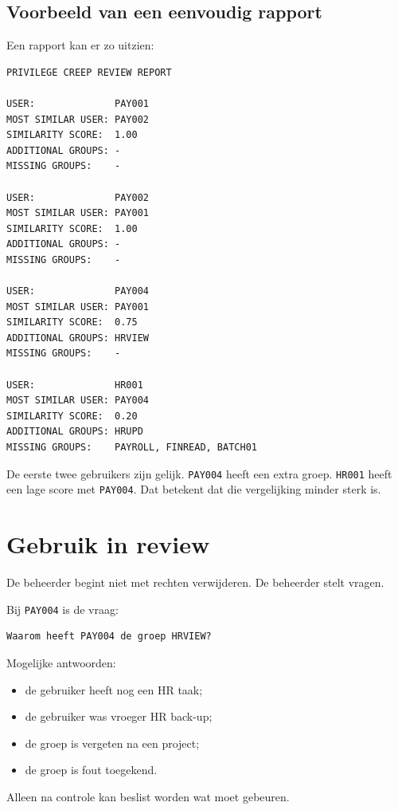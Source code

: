 \subsection*{Voorbeeld van een eenvoudig rapport}

Een rapport kan er zo uitzien:

\begin{verbatim}
PRIVILEGE CREEP REVIEW REPORT

USER:              PAY001
MOST SIMILAR USER: PAY002
SIMILARITY SCORE:  1.00
ADDITIONAL GROUPS: -
MISSING GROUPS:    -

USER:              PAY002
MOST SIMILAR USER: PAY001
SIMILARITY SCORE:  1.00
ADDITIONAL GROUPS: -
MISSING GROUPS:    -

USER:              PAY004
MOST SIMILAR USER: PAY001
SIMILARITY SCORE:  0.75
ADDITIONAL GROUPS: HRVIEW
MISSING GROUPS:    -

USER:              HR001
MOST SIMILAR USER: PAY004
SIMILARITY SCORE:  0.20
ADDITIONAL GROUPS: HRUPD
MISSING GROUPS:    PAYROLL, FINREAD, BATCH01
\end{verbatim}

De eerste twee gebruikers zijn gelijk. \texttt{PAY004} heeft een extra groep. \texttt{HR001} heeft een lage score met \texttt{PAY004}. Dat betekent dat die vergelijking minder sterk is.

\section{Gebruik in review}

De beheerder begint niet met rechten verwijderen. De beheerder stelt vragen.

Bij \texttt{PAY004} is de vraag:

\begin{verbatim}
Waarom heeft PAY004 de groep HRVIEW?
\end{verbatim}

Mogelijke antwoorden:

\begin{itemize}
	\item de gebruiker heeft nog een HR taak;
	\item de gebruiker was vroeger HR back-up;
	\item de groep is vergeten na een project;
	\item de groep is fout toegekend.
\end{itemize}

Alleen na controle kan beslist worden wat moet gebeuren.

